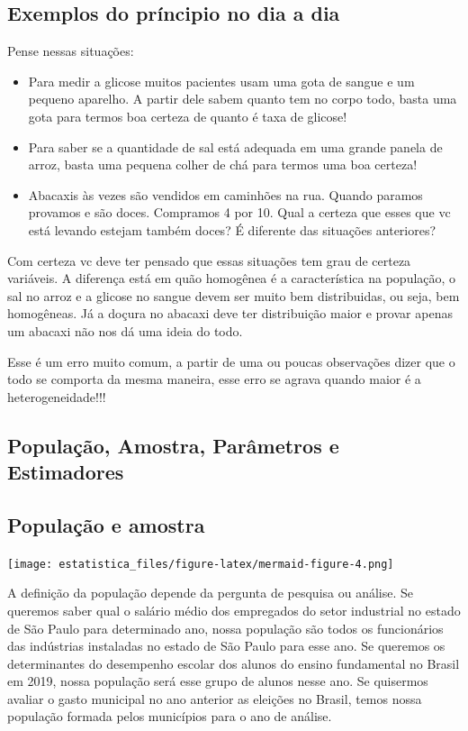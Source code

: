\documentclass[
  letterpaper,
  DIV=11,
  numbers=noendperiod]{scrreprt}
\providecommand{\tightlist}{%
  \setlength{\itemsep}{0pt}\setlength{\parskip}{0pt}}
\begin{document}
\subsection{Exemplos do príncipio no dia a
dia}\label{exemplos-do-pruxedncipio-no-dia-a-dia}

Pense nessas situações:

\begin{itemize}
\tightlist
\item
  Para medir a glicose muitos pacientes usam uma gota de sangue e um
  pequeno aparelho. A partir dele sabem quanto tem no corpo todo, basta
  uma gota para termos boa certeza de quanto é taxa de glicose!
\item
  Para saber se a quantidade de sal está adequada em uma grande panela
  de arroz, basta uma pequena colher de chá para termos uma boa certeza!
\item
  Abacaxis às vezes são vendidos em caminhões na rua. Quando paramos
  provamos e são doces. Compramos 4 por 10. Qual a certeza que esses que
  vc está levando estejam também doces? É diferente das situações
  anteriores?
\end{itemize}

Com certeza vc deve ter pensado que essas situações tem grau de certeza
variáveis. A diferença está em quão homogênea é a característica na
população, o sal no arroz e a glicose no sangue devem ser muito bem
distribuidas, ou seja, bem homogêneas. Já a doçura no abacaxi deve ter
distribuição maior e provar apenas um abacaxi não nos dá uma ideia do
todo.

Esse é um erro muito comum, a partir de uma ou poucas observações dizer
que o todo se comporta da mesma maneira, esse erro se agrava quando
maior é a heterogeneidade!!!

\subsection{População, Amostra, Parâmetros e
Estimadores}\label{populauxe7uxe3o-amostra-paruxe2metros-e-estimadores}

\subsection{População e amostra}\label{populauxe7uxe3o-e-amostra}

\texttt{[image: estatistica\_files/figure-latex/mermaid-figure-4.png]}

A definição da população depende da pergunta de pesquisa ou análise. Se
queremos saber qual o salário médio dos empregados do setor industrial
no estado de São Paulo para determinado ano, nossa população são todos
os funcionários das indústrias instaladas no estado de São Paulo para
esse ano. Se queremos os determinantes do desempenho escolar dos alunos
do ensino fundamental no Brasil em 2019, nossa população será esse grupo
de alunos nesse ano. Se quisermos avaliar o gasto municipal no ano
anterior as eleições no Brasil, temos nossa população formada pelos
municípios para o ano de análise.
\end{document}
